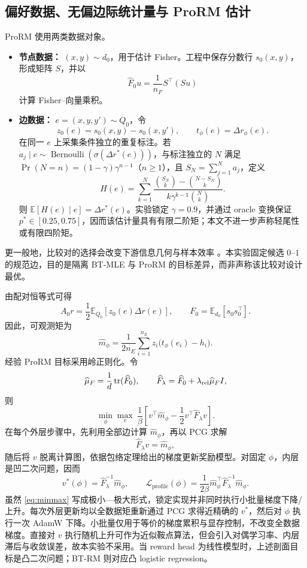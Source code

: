 \documentclass[UTF8,11pt,a4paper,fontset=none]{ctexart}
\newcommand{\E}{\mathbb{E}}
\newcommand{\sig}{\sigma}
\begin{document}
\subsection{偏好数据、无偏边际统计量与 ProRM 估计}

ProRM 使用两类数据对象。
\begin{itemize}
\item \textbf{节点数据：} $(x,y)\sim d_0$，用于估计 Fisher。工程中保存分数行 $s_0(x,y)$，形成矩阵 $S$，并以
\[
\widehat F_0u=\frac1{n_F}S^\top(Su)
\]
计算 Fisher--向量乘积。
\item \textbf{边数据：} $e=(x,y,y')\sim Q_0$，令
\[
z_0(e)=s_0(x,y)-s_0(x,y'),\qquad t_\phi(e)=\Delta r_\phi(e).
\]
在同一 $e$ 上采集条件独立的重复标注。若 $a_j\mid e\sim\operatorname{Bernoulli}(\sig(\Delta r^*(e)))$，与标注独立的 $N$ 满足 $\Pr(N=n)=(1-\gamma)\gamma^{n-1}$（$n\geq1$），且 $S_N=\sum_{j=1}^Na_j$，定义
\[
H(e)=\sum_{k=1}^{N}\frac{\binom{S_N}{k}-\binom{N-S_N}{k}}{k\gamma^{k-1}\binom Nk}.
\]
则 $\E[H(e)\mid e]=\Delta r^*(e)$。实验锁定 $\gamma=0.9$，并通过 oracle 变换保证 $p^*\in[0.25,0.75]$，因而该估计量具有有限二阶矩；本文不进一步声称轻尾性或有限四阶矩。
\end{itemize}

更一般地，比较对的选择会改变下游信息几何与样本效率 \cite{han_pairs}。本实验固定候选 $0$--$1$ 的规范边，目的是隔离 BT-MLE 与 ProRM 的目标差异，而非声称该比较对设计最优。

由配对恒等式可得
\[
A_0r=\frac12\E_{Q_0}[z_0(e)\Delta r(e)],\qquad
F_0=\E_{d_0}[s_0s_0^\top].
\]
因此，可观测矩为
\[
\widehat m_\phi=\frac1{2n_E}\sum_{i=1}^{n_E}z_i\bigl(t_\phi(e_i)-h_i\bigr).
\]
经验 ProRM 目标采用岭正则化。令
\[
\widehat\mu_F=\frac{1}{d}\operatorname{tr}(\widehat F_0),\qquad
\widehat F_{\lambda}=\widehat F_0+\lambda_{\rm rel}\widehat\mu_F I,
\]
则
\begin{equation}
\boxed{
\min_\phi\max_v\ \frac1\beta
\left[v^\top\widehat m_\phi-\frac12v^\top\widehat F_{\lambda}v\right].
}
\label{eq:minmax}
\end{equation}
在每个外层步骤中，先利用全部边计算 $\widehat m_\phi$，再以 PCG 求解
\[
\widehat F_{\lambda}v=\widehat m_\phi,
\]
随后将 $v$ 脱离计算图，依据包络定理给出的梯度更新奖励模型。对固定 $\phi$，内层是凹二次问题，因而
\[
v^*(\phi)=\widehat F_{\lambda}^{-1}\widehat m_\phi,\qquad
\mathcal L_{\mathrm{profile}}(\phi)=
\frac1{2\beta}\widehat m_\phi^\top\widehat F_{\lambda}^{-1}\widehat m_\phi.
\]
虽然 \cref{eq:minmax} 写成极小—极大形式，锁定实现并非同时执行小批量梯度下降/上升。每次外层更新均以全数据矩重新通过 PCG 求得近精确的 $v^*$，然后对 $\phi$ 执行一次 AdamW 下降。小批量仅用于等价的梯度累积与显存控制，不改变全数据梯度。直接对 $v$ 执行随机上升可作为近似鞍点算法，但会引入对偶学习率、内层滞后与收敛误差，故本实验不采用。当 reward head 为线性模型时，上述剖面目标是凸二次问题；BT-RM 则对应凸 logistic regression。
\end{document}
